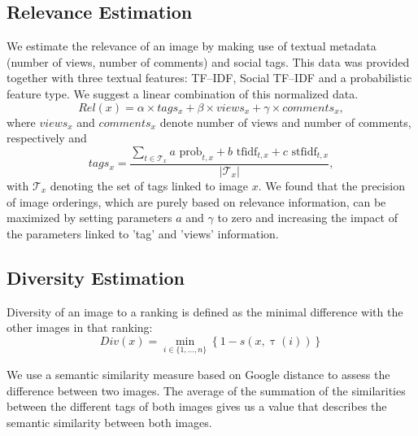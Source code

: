 \documentclass{acm_proc_article-me11_tweaked}
\begin{document}
\subsection{Relevance Estimation}
\label{text-relevance}
We estimate the relevance of an image by making use of textual metadata (number of views, number of comments) and social tags.
This data was provided together with three textual features: TF--IDF, Social TF--IDF and a probabilistic feature type.
We suggest a linear combination of this normalized data.
\begin{equation}
Rel(x) = \alpha \times tags_x + \beta \times views_x + \gamma \times comments_x,
\end{equation}
where $views_x$ and $comments_x$ denote number of views and number of comments, respectively and
\begin{equation}
tags_x = \frac{ \sum_{t \in \mathscr{T}_x} a\text{ prob}_{t,x} + b\text{ tfidf}_{t,x} + c\text{ stfidf}_{t,x}}{|\mathscr{T}_x|} , 
\end{equation}
with $\mathscr{T}_x$ denoting the set of tags linked to image $x$.
We found that the precision of image orderings, which are purely based on relevance information, can be maximized by setting parameters $a$ and $\gamma$ to zero and increasing the impact of the parameters linked to 'tag' and 'views' information.




\subsection{Diversity Estimation}
Diversity of an image to a ranking is defined as the minimal difference with the other images in that ranking:
\begin{equation}
 Div(x) = \min_{i \in \{1,\ldots,n\}} \left\{  1 - s(x, \uptau(i))\right\}
\end{equation}

We use a semantic similarity measure based on Google distance to assess the difference between two images.
The average of the summation of the similarities between the different tags of both images gives us a value that describes the semantic similarity between both images.
\end{document}
